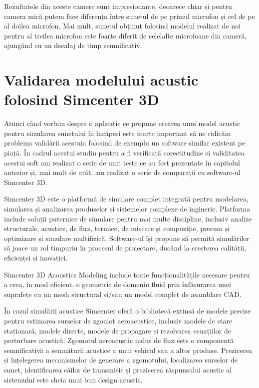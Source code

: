 	Rezultatele din aceste camere sunt impresionante, deoarece chiar și pentru camera mică putem face diferența între sunetul de pe primul microfon și cel de pe al doilea microfon. Mai mult, sunetul obținut folosind modelul realizat de noi pentru al treilea microfon este foarte diferit de celelalte microfoane din cameră, ajungând cu un decalaj de timp semnificativ.


\section{Validarea modelului acustic folosind Simcenter 3D}

	Atunci când vorbim despre o aplicație ce propune crearea unui model acustic pentru simularea sunetului în încăperi este foarte important să ne ridicăm problema validării acestuia folosind de exemplu un software similar existent pe piață. În cadrul acestui studiu pentru a fi verificată corectitudine si validitatea acestui soft am realizat o serie de unit teste ce au fost prezentate în capitolul anterior și, mai mult de atât, am realizat o serie de comparații cu software-ul Simcenter 3D.
	
	Simcenter 3D este o platformă de simulare complet integrată pentru modelarea, simularea și analizarea produselor și sistemelor complexe de inginerie. Platforma include soluții puternice de simulare pentru mai multe discipline, inclusiv analize structurale, acustice, de flux, termice, de mișcare și compoziție, precum și optimizare și simulare multifizică. Software-ul își propune să permită simulărilor să joace un rol timpuriu în procesul de proiectare, ducând la creșterea calității, eficienței și inovației.
	
	Simcenter 3D Acoustics Modeling include toate funcționalitățile necesare pentru a crea, în mod eficient, o geometrie de domeniu fluid prin înfășurarea unei suprafețe cu un mesh structural și/sau un model complet de asamblare CAD.
	
	În cazul simulării acustice Simcenter oferă o bibliotecă extinsă de modele precise pentru estimarea surselor de zgomot aeroacustice, inclusiv modele de stare staționară, modele directe, modele de propagare și rezolvarea ecuațiilor de perturbare acustică. Zgomotul aeroacustic indus de flux este o componentă semnificativă a semnăturii acustice a unui vehicul sau a altor produse. Prezicerea și înțelegerea mecanismelor de generare a zgomotului, localizarea surselor de sunet, identificarea căilor de transmisie și prezicerea răspunsului acustic al sistemului este cheia unui bun design acustic.
	
